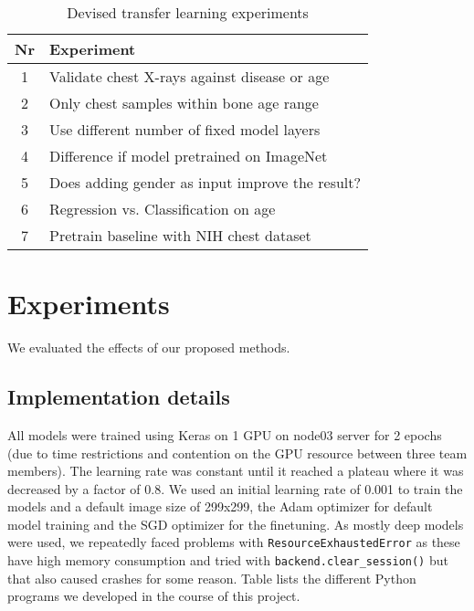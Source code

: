 \documentclass[10pt,twocolumn,letterpaper]{article}
\begin{document}
\begin{table}[h]
\begin{center}
\begin{tabular}{|c|l|}
\hline
Nr & Experiment \\
\hline\hline
1 & Validate chest X-rays against disease or age \\
2 & Only chest samples within bone age range \\
3 & Use different number of fixed model layers \\
4 & Difference if model pretrained on ImageNet \\
5 & Does adding gender as input improve the result? \\
6 & Regression vs. Classification on age \\
7 & Pretrain baseline \cite{kaggleboneage} with NIH chest dataset \\
\hline
\end{tabular}
\end{center}
\caption{Devised transfer learning experiments}
\label{table:taexp}
\end{table}




\section{Experiments}
We evaluated the effects of our proposed methods.

\subsection{Implementation details}
All models were trained using Keras \cite{keras} on 1 GPU on node03 server for 2 epochs (due to time restrictions and contention on the GPU resource between three team members). The learning rate was constant until it reached a plateau where it was decreased by a factor of 0.8. We used an initial learning rate of 0.001 to train the models and a default image size of 299x299, the Adam optimizer for default model training and the SGD optimizer for the finetuning. As mostly deep models were used, we repeatedly faced problems with \verb+ResourceExhaustedError+ as these have high memory consumption and tried with \verb+backend.clear_session()+ but that also caused crashes for some reason. Table lists the different Python programs we developed in the course of this project.
\end{document}
